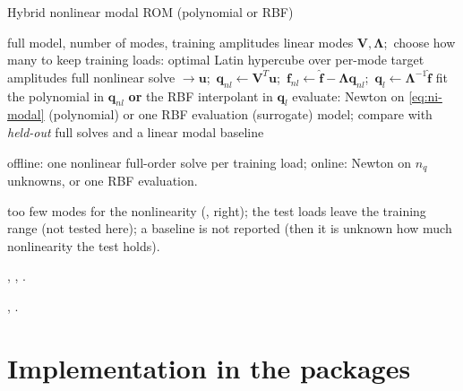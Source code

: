 
\begin{algbox}{Hybrid nonlinear modal ROM (polynomial or RBF)}
\begin{pseudo}
\Require full model, number of modes, training amplitudes
\State linear modes $\bm V,\bm\Lambda$;\ choose how many to keep
\State training loads: optimal Latin hypercube over per-mode target amplitudes
  \State full nonlinear solve $\to\bm u$;\ $\bm q_{nl}\gets\bm V^T\bm u$;\ $\bm f_{nl}\gets\hat{\bm f}-\bm\Lambda\bm q_{nl}$;\ $\bm q_l\gets\bm\Lambda^{-1}\hat{\bm f}$
\EndFor
\State fit the polynomial in $\bm q_{nl}$ \textbf{or} the RBF interpolant in $\bm q_l$
\State evaluate: Newton on \eqref{eq:ni-modal} (polynomial) or one RBF evaluation (surrogate)
\Ensure model; compare with \emph{held-out} full solves and a linear modal baseline
\end{pseudo}
\begin{algdet}
\item[Cost] offline: one nonlinear full-order solve per training load; online: Newton on $n_q$ unknowns, or one RBF evaluation.
\item[Fails when] too few modes for the nonlinearity (, right); the test loads leave the training range (not tested here); a baseline is not reported (then it is unknown how much nonlinearity the test holds).
\item[Code] , , .
\item[Verified in] , .
\end{algdet}
\end{algbox}


\section{Implementation in the packages}\label{sec:ni-impl}

